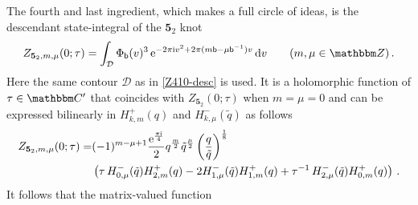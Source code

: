 \documentclass[12pt,reqno]{amsart}
\theoremstyle{definition}
\def\BZ{\mathbbm Z}
\def\BC{\mathbbm C}
\def\tq{\tilde{q}}
\def\bb{\mathsf{b}}
\def\ri{\mathrm{i}}
\def\rd{\mathrm{d}}
\def\re{{\rm e}}
\def\ri{{\rm i}}
\def\rd{{\rm d}}
\def\mc{\mathcal}
\def\md{\mathbf}
\newcommand{\knot}[1]{\md{#1}}
\begin{document}
The fourth and last ingredient, which makes a full circle of ideas, is
the descendant state-integral of the $\knot{5}_2$ knot 
\begin{equation}
  \label{Z520-desc}
  Z_{\knot{5}_2,m,\mu}(0;\tau) = 
  \int_{\mc{D}} \Phi_\bb(v)^3 \,
  \re^{-2\pi \ri v^2 + 2\pi(m \bb - \mu \bb^{-1})v} \, \rd v \qquad
  (m, \mu \in \BZ) \,.
\end{equation}
Here the same contour $\mc{D}$ as in \eqref{Z410-desc} is used.  It is
a holomorphic function of $\tau \in \BC'$ that coincides with
$Z_{\knot{5}_2}(0;\tau)$ when $m=\mu=0$ and can be expressed
bilinearly in $H^+_{k,m}(q)$ and $H^-_{k,\mu}(\tq)$ as follows
\begin{align}
  \label{520-desc-fac}
    Z_{\knot{5}_2,m,\mu}(0;\tau) 
    =&
    (-1)^{m-\mu+1}\frac{\re^{\frac{\pi\ri}{4}}}{2}
    q^{\frac{m}{2}}\tq^{\frac{\mu}{2}} 
    \left(\frac{q}{\tq}\right)^{\frac{1}{8}} \\ \notag & %
    \left(\tau \, H^-_{0,\mu}(\tq)H^+_{2,m}(q)
      -2H^-_{1,\mu}(\tq)H^+_{1,m}(q) +
      \tau^{-1}\, H^-_{2,\mu}(\tq)H^+_{0,m}(q)\right) \,.
\end{align}
It follows that the matrix-valued function 
\end{document}
